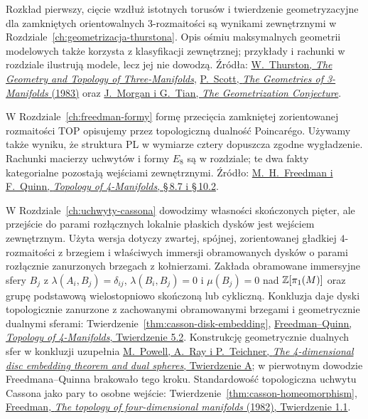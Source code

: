 \begin{description}[leftmargin=2.9cm,style=nextline]
\item[Geometryzacja rozmaitości trójwymiarowych.]
  Rozkład pierwszy, cięcie wzdłuż istotnych torusów
  i twierdzenie geometryzacyjne dla zamkniętych
  orientowalnych $3$-rozmaitości są wynikami zewnętrznymi
  w Rozdziale~\ref{ch:geometrizacja-thurstona}.
  Opis ośmiu maksymalnych geometrii modelowych także
  korzysta z klasyfikacji zewnętrznej; przykłady i rachunki
  w rozdziale ilustrują modele, lecz jej nie dowodzą.
  Źródła:
  \href{https://library.slmath.org/nonmsri/gt3m/PDF/Thurston-gt3m.pdf}
  {W.\ Thurston, \emph{The Geometry and Topology of Three-Manifolds}},
  \href{https://sschleimer.warwick.ac.uk/Teach/2021_3MFDS/References/1983the_geometries_of_three-manifolds.pdf}
  {P.\ Scott, \emph{The Geometries of 3-Manifolds} (1983)}
  oraz \href{https://www.claymath.org/wp-content/uploads/2022/03/Geom.pdf}
  {J.\ Morgan i G.\ Tian, \emph{The Geometrization Conjecture}}.

\item[Topologiczna dualność i wygładzanie PL w wymiarze cztery.]
  W Rozdziale~\ref{ch:freedman-formy} formę przecięcia
  zamkniętej zorientowanej rozmaitości TOP opisujemy przez topologiczną
  dualność Poincarégo. Używamy także wyniku, że
  struktura PL w wymiarze cztery dopuszcza zgodne
  wygładzenie. Rachunki macierzy uchwytów i formy $E_8$
  są w rozdziale; te dwa fakty kategorialne pozostają
  wejściami zewnętrznymi. Źródło:
  \href{https://archive.mpim-bonn.mpg.de/4789/2/FreedmanQuinn-TopologyOf4Manifolds-Reformatted2013.pdf}
  {M.\ H.\ Freedman i F.\ Quinn, \emph{Topology of
  4-Manifolds}, \S\,8.7 i \S\,10.2}.

\item[Zanurzanie dysków i uchwyty Cassona.]
  W Rozdziale~\ref{ch:uchwyty-cassona} dowodzimy
  własności skończonych pięter, ale przejście do
  parami rozłącznych lokalnie płaskich dysków jest
  wejściem zewnętrznym. Użyta wersja dotyczy zwartej,
  spójnej, zorientowanej gładkiej $4$-rozmaitości
  z brzegiem i właściwych immersji obramowanych dysków
  o parami rozłącznie zanurzonych brzegach z kołnierzami.
  Zakłada obramowane immersyjne sfery $B_j$ z
  $\lambda(A_i,B_j)=\delta_{ij}$,
  $\lambda(B_i,B_j)=0$ i $\mu(B_j)=0$ nad
  $\mathbb{Z}[\pi_1(M)]$ oraz grupę podstawową wielostopniowo
  skończoną lub cykliczną. Konkluzja daje dyski
  topologicznie zanurzone z zachowanymi obramowanymi
  brzegami i geometrycznie dualnymi sferami:
  Twierdzenie~\ref{thm:casson-disk-embedding},
  \href{https://archive.mpim-bonn.mpg.de/4789/2/FreedmanQuinn-TopologyOf4Manifolds-Reformatted2013.pdf}
  {Freedman--Quinn, \emph{Topology of 4-Manifolds},
  Twierdzenie 5.2}. Konstrukcję geometrycznie
  dualnych sfer w konkluzji uzupełnia
  \href{https://arxiv.org/pdf/2006.05209}
  {M.\ Powell, A.\ Ray i P.\ Teichner,
  \emph{The 4-dimensional disc embedding theorem
  and dual spheres}, Twierdzenie A}; w pierwotnym
  dowodzie Freedmana--Quinna brakowało tego kroku.
  Standardowość topologiczna
  uchwytu Cassona jako pary to osobne wejście:
  Twierdzenie~\ref{thm:casson-homeomorphism},
  \href{https://www.maths.gla.ac.uk/~mpowell/1982_The%20topology%20of%20four-dimensional%20manifolds.pdf}
  {Freedman, \emph{The topology of four-dimensional
  manifolds} (1982), Twierdzenie 1.1}.


\end{description}
